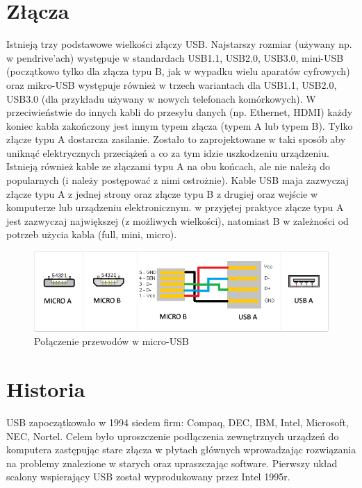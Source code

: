 \documentclass{BscUS}
\begin{document}
\section{Złącza}
Istnieją trzy podstawowe wielkości złączy USB. Najstarszy rozmiar (używany np. w pendrive'ach) występuje w standardach USB1.1, USB2.0, USB3.0, mini-USB (początkowo tylko dla złącza typu B, jak w wypadku wielu aparatów cyfrowych) oraz mikro-USB występuje również w trzech wariantach dla USB1.1, USB2.0, USB3.0 (dla przykładu używany w nowych telefonach komórkowych).
\newline
W przeciwieństwie do innych kabli do przesyłu danych (np. Ethernet, HDMI) każdy koniec kabla zakończony jest innym typem złącza (typem A lub typem B). Tylko złącze typu A dostarcza zasilanie. Zostało to zaprojektowane w taki sposób aby uniknąć elektrycznych przeciążeń a co za tym idzie uszkodzeniu urządzeniu. Istnieją również kable ze złączami typu A na obu końcach, ale nie należą do popularnych (i należy postępować z nimi ostrożnie). Kable USB maja zazwyczaj złącze typu A z jednej strony oraz złącze typu B z drugiej oraz wejście w komputerze lub urządzeniu elektronicznym. w przyjętej praktyce złącze typu A jest zazwyczaj największej (z możliwych wielkości), natomiast B w zależności od potrzeb użycia kabla (full, mini, micro). 

\begin{figure}[h]
\centering
\includegraphics[width=15cm]{./img/micro-usb-type}
\caption{Połączenie przewodów w micro-USB}
\end{figure}

%
%
\section{Historia}
USB zapoczątkowało w 1994 siedem firm: Compaq, DEC, IBM, Intel, Microsoft, NEC, Nortel. Celem było uproszczenie podłączenia zewnętrznych urządzeń do komputera zastępując stare złącza w płytach głównych wprowadzając rozwiązania na problemy znalezione w starych oraz upraszczając software.
Pierwszy układ scalony wspierający USB został wyprodukowany przez Intel 1995r.
\newline
\end{document}

